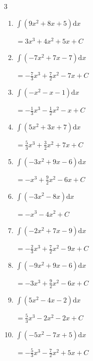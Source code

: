 \begin{multicols}{3}
\begin{enumerate}
        $\displaystyle =x^{3}+x^{2}-4x+ C$

  \item $\displaystyle \int \left( 9x^{2}+8x+5 \right) \mathrm{d}x$

        $\displaystyle =3x^{3}+4x^{2}+5x+ C$

  \item $\displaystyle \int \left( -7x^{2}+7x-7 \right) \mathrm{d}x$

        $\displaystyle =-\frac{7}{3}x^{3}+\frac{7}{2}x^{2}-7x+ C$

  \item $\displaystyle \int \left( -x^{2}-x-1 \right) \mathrm{d}x$

        $\displaystyle =-\frac{1}{3}x^{3}-\frac{1}{2}x^{2}-x+ C$

\columnbreak %

  \item $\displaystyle \int \left( 5x^{2}+3x+7 \right) \mathrm{d}x$

        $\displaystyle =\frac{5}{3}x^{3}+\frac{3}{2}x^{2}+7x+ C$

  \item $\displaystyle \int \left( -3x^{2}+9x-6 \right) \mathrm{d}x$

        $\displaystyle =-x^{3}+\frac{9}{2}x^{2}-6x+ C$

  \item $\displaystyle \int \left( -3x^{2}-8x \right) \mathrm{d}x$

        $\displaystyle =-x^{3}-4x^{2}+ C$

  \item $\displaystyle \int \left( -2x^{2}+7x-9 \right) \mathrm{d}x$

        $\displaystyle =-\frac{2}{3}x^{3}+\frac{7}{2}x^{2}-9x+ C$

  \item $\displaystyle \int \left( -9x^{2}+9x-6 \right) \mathrm{d}x$

        $\displaystyle =-3x^{3}+\frac{9}{2}x^{2}-6x+ C$

  \item $\displaystyle \int \left( 5x^{2}-4x-2 \right) \mathrm{d}x$

        $\displaystyle =\frac{5}{3}x^{3}-2x^{2}-2x+ C$

  \item $\displaystyle \int \left( -5x^{2}-7x+5 \right) \mathrm{d}x$

        $\displaystyle =-\frac{5}{3}x^{3}-\frac{7}{2}x^{2}+5x+ C$


\end{enumerate}
\end{multicols}
